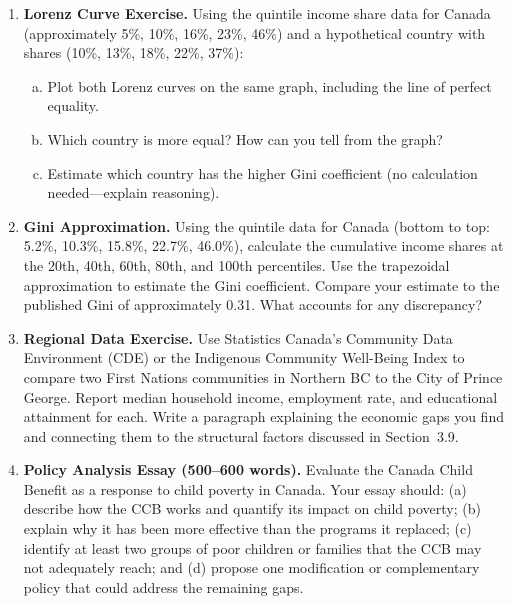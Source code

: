 \begin{enumerate}

\item \textbf{Lorenz Curve Exercise.} Using the quintile income share data for Canada (approximately 5\%, 10\%, 16\%, 23\%, 46\%) and a hypothetical country with shares (10\%, 13\%, 18\%, 22\%, 37\%):
  \begin{enumerate}[(a)]
    \item Plot both Lorenz curves on the same graph, including the line of perfect equality.
    \item Which country is more equal? How can you tell from the graph?
    \item Estimate which country has the higher Gini coefficient (no calculation needed---explain reasoning).
  \end{enumerate}

\item \textbf{Gini Approximation.} Using the quintile data for Canada (bottom to top: 5.2\%, 10.3\%, 15.8\%, 22.7\%, 46.0\%), calculate the cumulative income shares at the 20th, 40th, 60th, 80th, and 100th percentiles. Use the trapezoidal approximation to estimate the Gini coefficient. Compare your estimate to the published Gini of approximately 0.31. What accounts for any discrepancy?

\item \textbf{Regional Data Exercise.} Use Statistics Canada's Community Data Environment (CDE) or the Indigenous Community Well-Being Index to compare two First Nations communities in Northern BC to the City of Prince George. Report median household income, employment rate, and educational attainment for each. Write a paragraph explaining the economic gaps you find and connecting them to the structural factors discussed in Section~3.9.

\item \textbf{Policy Analysis Essay (500--600 words).} Evaluate the Canada Child Benefit as a response to child poverty in Canada. Your essay should: (a) describe how the CCB works and quantify its impact on child poverty; (b) explain why it has been more effective than the programs it replaced; (c) identify at least two groups of poor children or families that the CCB may not adequately reach; and (d) propose one modification or complementary policy that could address the remaining gaps.

\end{enumerate}
